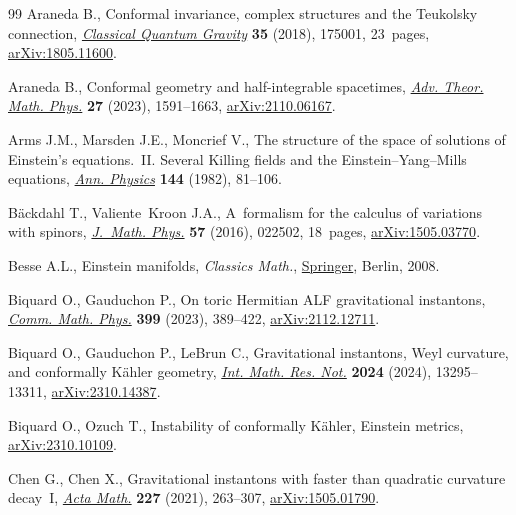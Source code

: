 \documentclass[10pt,a4paper]{amsart}
\numberwithin{equation}{section}
\begin{document}
\begin{thebibliography}{99}
Araneda B., Conformal invariance, complex structures and the {T}eukolsky
 connection, \href{https://doi.org/10.1088/1361-6382/aad13b}{\textit{Classical Quantum Gravity}} \textbf{35} (2018), 175001,
 23~pages, \href{https://arxiv.org/abs/1805.11600}{arXiv:1805.11600}.

Araneda B., Conformal geometry and half-integrable spacetimes, \href{https://doi.org/10.4310/atmp.2023.v27.n6.a1}{\textit{Adv.
 Theor. Math. Phys.}} \textbf{27} (2023), 1591--1663, \href{https://arxiv.org/abs/2110.06167}{arXiv:2110.06167}.

Arms J.M., Marsden J.E., Moncrief V., The structure of the space of solutions
 of {E}instein's equations.~{II}. {S}everal {K}illing fields and the
 {E}instein--{Y}ang--{M}ills equations, \href{https://doi.org/10.1016/0003-4916(82)90105-1}{\textit{Ann. Physics}} \textbf{144}
 (1982), 81--106.

B\"ackdahl T., Valiente~Kroon J.A., A~formalism for the calculus of variations
 with spinors, \href{https://doi.org/10.1063/1.4939562}{\textit{J.~Math. Phys.}} \textbf{57} (2016), 022502, 18~pages,
 \href{https://arxiv.org/abs/1505.03770}{arXiv:1505.03770}.

Besse A.L., Einstein manifolds, \textit{Classics Math.}, \href{https://doi.org/10.1007/978-3-540-74311-8}{Springer}, Berlin, 2008.

Biquard O., Gauduchon P., On toric {H}ermitian {ALF} gravitational instantons,
 \href{https://doi.org/10.1007/s00220-022-04562-z}{\textit{Comm. Math. Phys.}} \textbf{399} (2023), 389--422,
 \href{https://arxiv.org/abs/2112.12711}{arXiv:2112.12711}.

Biquard O., Gauduchon P., LeBrun C., Gravitational instantons, {W}eyl
 curvature, and conformally {K}\"ahler geometry, \href{https://doi.org/10.1093/imrn/rnae200}{\textit{Int. Math. Res. Not.}}
 \textbf{2024} (2024), 13295--13311, \href{https://arxiv.org/abs/2310.14387}{arXiv:2310.14387}.

Biquard O., Ozuch T., Instability of conformally {K}\"ahler, {E}instein
 metrics, \href{https://arxiv.org/abs/2310.10109}{arXiv:2310.10109}.

Chen G., Chen X., Gravitational instantons with faster than quadratic curvature
 decay~{I}, \href{https://doi.org/10.4310/acta.2021.v227.n2.a2}{\textit{Acta Math.}} \textbf{227} (2021), 263--307,
 \href{https://arxiv.org/abs/1505.01790}{arXiv:1505.01790}.


\end{thebibliography}
\end{document}
